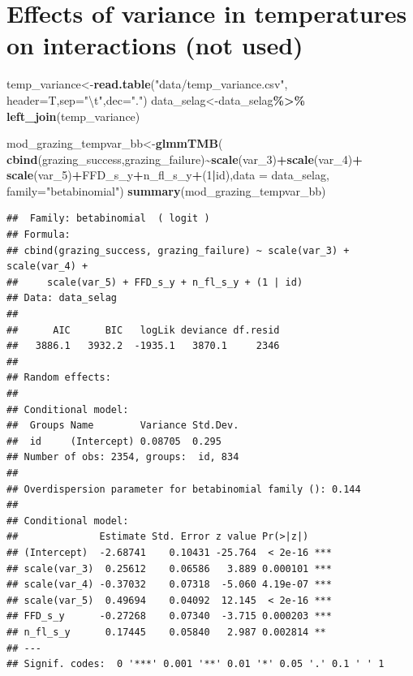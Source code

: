 \documentclass[
]{article}
\newenvironment{Shaded}{\begin{snugshade}}{\end{snugshade}}
\newcommand{\CharTok}[1]{\textcolor[rgb]{0.31,0.60,0.02}{#1}}
\newcommand{\DataTypeTok}[1]{\textcolor[rgb]{0.13,0.29,0.53}{#1}}
\newcommand{\DecValTok}[1]{\textcolor[rgb]{0.00,0.00,0.81}{#1}}
\newcommand{\KeywordTok}[1]{\textcolor[rgb]{0.13,0.29,0.53}{\textbf{#1}}}
\newcommand{\NormalTok}[1]{#1}
\newcommand{\OperatorTok}[1]{\textcolor[rgb]{0.81,0.36,0.00}{\textbf{#1}}}
\newcommand{\StringTok}[1]{\textcolor[rgb]{0.31,0.60,0.02}{#1}}
\begin{document}
\hypertarget{effects-of-variance-in-temperatures-on-interactions-not-used}{%
\section{Effects of variance in temperatures on interactions (not
used)}\label{effects-of-variance-in-temperatures-on-interactions-not-used}}

\begin{Shaded}
\begin{Highlighting}[]
\NormalTok{temp\_variance\textless{}{-}}\KeywordTok{read.table}\NormalTok{(}\StringTok{"data/temp\_variance.csv"}\NormalTok{,}
                          \DataTypeTok{header=}\NormalTok{T,}\DataTypeTok{sep=}\StringTok{"}\CharTok{\textbackslash{}t}\StringTok{"}\NormalTok{,}\DataTypeTok{dec=}\StringTok{"."}\NormalTok{) }
\NormalTok{data\_selag\textless{}{-}data\_selag}\OperatorTok{\%\textgreater{}\%}
\StringTok{  }\KeywordTok{left\_join}\NormalTok{(temp\_variance)}
\end{Highlighting}
\end{Shaded}

\begin{Shaded}
\begin{Highlighting}[]
\NormalTok{mod\_grazing\_tempvar\_bb\textless{}{-}}\KeywordTok{glmmTMB}\NormalTok{(}
  \KeywordTok{cbind}\NormalTok{(grazing\_success,grazing\_failure)}\OperatorTok{\textasciitilde{}}\KeywordTok{scale}\NormalTok{(var\_}\DecValTok{3}\NormalTok{)}\OperatorTok{+}\KeywordTok{scale}\NormalTok{(var\_}\DecValTok{4}\NormalTok{)}\OperatorTok{+}
\StringTok{    }\KeywordTok{scale}\NormalTok{(var\_}\DecValTok{5}\NormalTok{)}\OperatorTok{+}\NormalTok{FFD\_s\_y}\OperatorTok{+}\NormalTok{n\_fl\_s\_y}\OperatorTok{+}\NormalTok{(}\DecValTok{1}\OperatorTok{|}\NormalTok{id),}\DataTypeTok{data =}\NormalTok{ data\_selag,}
  \DataTypeTok{family=}\StringTok{"betabinomial"}\NormalTok{)}
\KeywordTok{summary}\NormalTok{(mod\_grazing\_tempvar\_bb)}
\end{Highlighting}
\end{Shaded}

\begin{verbatim}
##  Family: betabinomial  ( logit )
## Formula:          
## cbind(grazing_success, grazing_failure) ~ scale(var_3) + scale(var_4) +  
##     scale(var_5) + FFD_s_y + n_fl_s_y + (1 | id)
## Data: data_selag
## 
##      AIC      BIC   logLik deviance df.resid 
##   3886.1   3932.2  -1935.1   3870.1     2346 
## 
## Random effects:
## 
## Conditional model:
##  Groups Name        Variance Std.Dev.
##  id     (Intercept) 0.08705  0.295   
## Number of obs: 2354, groups:  id, 834
## 
## Overdispersion parameter for betabinomial family (): 0.144 
## 
## Conditional model:
##              Estimate Std. Error z value Pr(>|z|)    
## (Intercept)  -2.68741    0.10431 -25.764  < 2e-16 ***
## scale(var_3)  0.25612    0.06586   3.889 0.000101 ***
## scale(var_4) -0.37032    0.07318  -5.060 4.19e-07 ***
## scale(var_5)  0.49694    0.04092  12.145  < 2e-16 ***
## FFD_s_y      -0.27268    0.07340  -3.715 0.000203 ***
## n_fl_s_y      0.17445    0.05840   2.987 0.002814 ** 
## ---
## Signif. codes:  0 '***' 0.001 '**' 0.01 '*' 0.05 '.' 0.1 ' ' 1
\end{verbatim}
\end{document}
